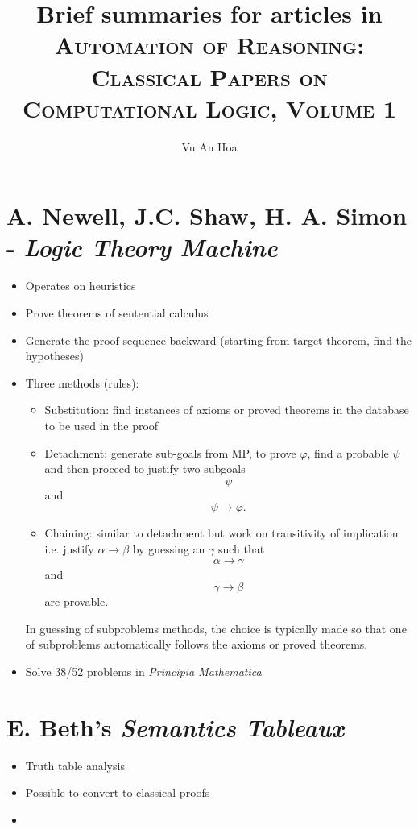 \documentclass{article}
\begin{document}
\title{Brief summaries for articles in \textsc{Automation of Reasoning: Classical Papers on Computational Logic, Volume 1}}
\author{Vu An Hoa}
\maketitle

\section{A. Newell, J.C. Shaw, H. A. Simon - \emph{Logic Theory Machine}}

\begin{itemize}
\item Operates on heuristics
\item Prove theorems of sentential calculus
\item Generate the proof sequence backward (starting from target theorem, find the hypotheses)
\item Three methods (rules):
\begin{itemize}
\item Substitution: find instances of axioms or proved theorems in the database to be used in the proof
\item Detachment: generate sub-goals from MP, to prove $\varphi$, find a probable $\psi$ and then proceed to justify two subgoals
$$\psi$$
and
$$\psi \rightarrow \varphi.$$
\item Chaining: similar to detachment but work on transitivity of implication i.e. justify $\alpha \rightarrow \beta$ by guessing an $\gamma$ such that
$$\alpha \rightarrow \gamma$$
and
$$\gamma \rightarrow \beta$$
are provable.
\end{itemize}
In guessing of subproblems methods, the choice is typically made so that one of subproblems automatically follows the axioms or proved theorems.
\item Solve 38/52 problems in \emph{Principia Mathematica}
\end{itemize}

\section{E. Beth's \emph{Semantics Tableaux}}

\begin{itemize}
\item Truth table analysis
\item Possible to convert to classical proofs
\item 
\end{itemize}
\end{document}
